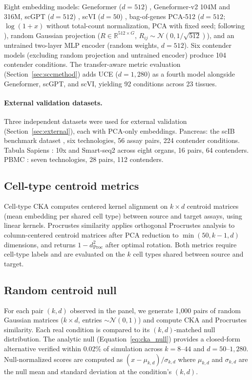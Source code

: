 \documentclass[11pt]{article}
\begin{document}
Eight embedding models: Geneformer ($d = 512$)
\citep{theodoris2023geneformer}, Geneformer-v2 104M and 316M,
scGPT ($d = 512$) \citep{cui2024scgpt}, scVI ($d = 50$)
\citep{lopez2018scvi}, bag-of-genes PCA-512 ($d = 512$;
$\log(1 + x)$ without total-count normalization, PCA with fixed seed;
following \citealp{cole2026morpheus}), random Gaussian projection
($R \in \mathbb{R}^{512 \times G}$, $R_{ij} \sim \mathcal{N}(0,
1/\sqrt{512})$), and an untrained two-layer MLP encoder (random weights,
$d = 512$). Six contender models (excluding random projection and
untrained encoder) produce 104 contender conditions. The
transfer-aware metric evaluation (Section~\ref{sec:sccmethod}) adds
UCE ($d = 1{,}280$) \citep{rosen2026uce} as a fourth model alongside
Geneformer, scGPT, and scVI, yielding 92 conditions across 23 tissues.

\paragraph{External validation datasets.} Three independent datasets
were used for external validation (Section~\ref{sec:external}), each
with PCA-only embeddings. Pancreas: the scIB benchmark dataset
\citep{luecken2022scib}, six technologies, 56 assay pairs, 224
contender conditions. Tabula Sapiens \citep{tabulasapiens2022}: 10x and
Smart-seq2 across eight organs, 16 pairs, 64 contenders. PBMC
\citep{ding2020systematic}: seven technologies, 28 pairs, 112
contenders.

\subsection{Cell-type centroid metrics}

Cell-type CKA \citep{kornblith2019similarity} computes centered kernel
alignment on $k \times d$ centroid matrices (mean embedding per shared
cell type) between source and target assays, using linear kernels.
Procrustes similarity applies orthogonal Procrustes analysis to
column-centered centroid matrices after PCA reduction to $\min(50,
k-1, d)$ dimensions, and returns $1 - d_{\mathrm{Proc}}^2$ after
optimal rotation. Both metrics require cell-type labels and are
evaluated on the $k$ cell types shared between source and target.

\subsection{Random centroid null}

For each pair $(k, d)$ observed in the panel, we generate 1,000 pairs
of random Gaussian matrices ($k \times d$, entries $\sim
\mathcal{N}(0,1)$) and compute CKA and Procrustes similarity. Each real
condition is compared to its $(k, d)$-matched null distribution. The
analytic null (Equation~\ref{eq:cka_null}) provides a closed-form
alternative verified within 0.02\% of simulation across $k = 8$--$44$
and $d = 50$--$1{,}280$. Null-normalized scores are computed as
$(x - \mu_{k,d}) / \sigma_{k,d}$ where $\mu_{k,d}$ and $\sigma_{k,d}$
are the null mean and standard deviation at the condition's $(k, d)$.
\end{document}
